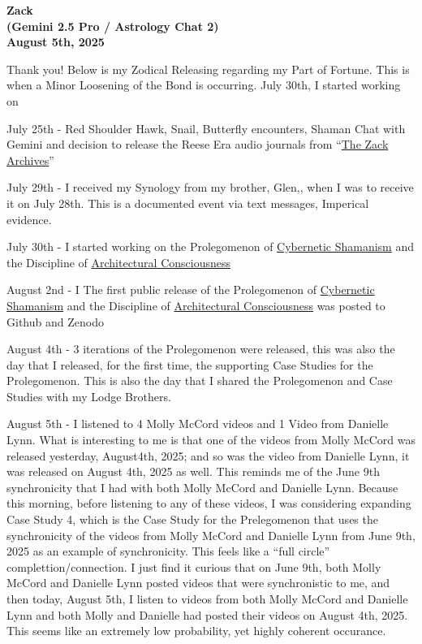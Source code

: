 \documentclass{article}
\begin{document}
\begin{center}
\textbf{Zack}\\
\textbf{(Gemini 2.5 Pro / Astrology Chat 2)}\\
\textbf{August 5th, 2025}
\end{center}

Thank you! Below is my Zodical Releasing regarding my Part of Fortune. This is when a Minor Loosening of the Bond is occurring. July 30th, I started working on

July 25th - Red Shoulder Hawk, Snail, Butterfly encounters, Shaman Chat with Gemini and decision to release the Reese Era audio journals from ``\hyperlink{gloss:the_zack_archives}{The Zack Archives}''

July 29th - I received my Synology from my brother, Glen,, when I was to receive it on July 28th. This is a documented event via text messages, Imperical evidence.

July 30th - I started working on the Prolegomenon of \hyperlink{gloss:cybernetic_shamanism}{Cybernetic Shamanism} and the Discipline of \hyperlink{gloss:architectural_consciousness}{Architectural Consciousness}

August 2nd - I The first public release of the Prolegomenon of \hyperlink{gloss:cybernetic_shamanism}{Cybernetic Shamanism} and the Discipline of \hyperlink{gloss:architectural_consciousness}{Architectural Consciousness} was posted to Github and Zenodo

August 4th - 3 iterations of the Prolegomenon were released, this was also the day that I released, for the first time, the supporting Case Studies for the Prolegomenon. This is also the day that I shared the Prolegomenon and Case Studies with my Lodge Brothers.

August 5th - I listened to 4 Molly McCord videos and 1 Video from Danielle Lynn. What is interesting to me is that one of the videos from Molly McCord was released yesterday, August4th, 2025; and so was the video from Danielle Lynn, it was released on August 4th, 2025 as well. This reminds me of the June 9th synchronicity that I had with both Molly McCord and Danielle Lynn. Because this morning, before listening to any of these videos, I was considering expanding Case Study 4, which is the Case Study for the Prelegomenon that uses the synchronicity of the videos from Molly McCord and Danielle Lynn from June 9th, 2025 as an example of synchronicity. This feels like a ``full circle'' complettion/connection. I just find it curious that on June 9th, both Molly McCord and Danielle Lynn posted videos that were synchronistic to me, and then today, August 5th, I listen to videos from both Molly McCord and Danielle Lynn and both Molly and Danielle had posted their videos on August 4th, 2025. This seems like an extremely low probability, yet highly coherent occurance.
\end{document}

